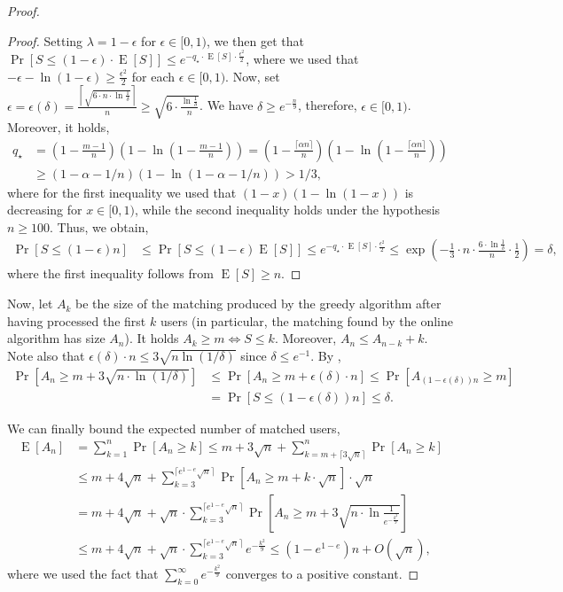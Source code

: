 \documentclass[11pt]{article}
\DeclareMathOperator*{\E}{E}
\begin{document}
\begin{proof}
\begin{proof}
Setting $\lambda = 1-\epsilon$ for $\epsilon \in [0,1)$, we then get that
$\Pr\left[S \le (1 - \epsilon) \cdot \E[S]\right] \le e^{-q_{\star} \cdot \E[S] \cdot \frac{\epsilon^2}2}$,
where we used that $-\epsilon - \ln (1-\epsilon) \ge \frac{\epsilon^2}2$ for each $\epsilon \in [0,1)$. Now, set $\epsilon=\epsilon(\delta) = \frac{\left\lceil \sqrt{6\cdot n \cdot \ln \frac{1}{\delta}} \right\rceil}{n} \geq \sqrt{6\cdot \frac{\ln \frac{1}{\delta}}{n}}$. We  have $\delta \geq e^{- \frac{n}{9}}$, therefore, $\epsilon\in [0,1)$. Moreover, it holds,
\begin{align*}
q_{\star} & =\left(1 - \frac{m-1}{n}\right)\left(1 - \ln\left(1-\frac{m-1}{n}\right)\right) =\left(1 - \frac{\lceil \alpha n \rceil}{n}\right)\left(1 - \ln\left(1-\frac{\lceil \alpha n \rceil}{n}\right)\right) \\
& \geq (1-\alpha - 1/n)(1- \ln(1-\alpha - 1/n)) > 1/3,
\end{align*}
where for the first inequality we used that $(1-x)(1 - \ln(1-x))$ is decreasing for $x\in[0,1)$, while the second inequality holds under the hypothesis $n\geq 100$. Thus, we obtain,
\begin{align*}
\Pr[S \leq (1-\epsilon) n] & \leq \Pr[S \leq (1-\epsilon) \E[S]]  \leq e^{-q_{\star} \cdot \E[S] \cdot \frac{\epsilon^2}{2}} \leq \exp\left(-\frac13 \cdot n \cdot \frac{6 \cdot \ln \frac{1}{\delta}}{n} \cdot \frac12 \right)  = \delta,
\end{align*}
where the first inequality follows from $\E[S] \geq n$.
\end{proof}
Now, let $A_k$ be the size of the matching produced by the greedy algorithm  after having processed the first $k$ users (in particular, the matching found by the online algorithm has size $A_n$). It holds $A_k \geq m \iff S \leq k$. Moreover, $A_{n} \leq A_{n-k} + k$. Note also that $\epsilon(\delta)\cdot n \leq 3\sqrt{n\ln(1/\delta)}$ since $\delta \leq e^{-1}$. By ,
\begin{align*}
\Pr[A_n \geq m + 3\sqrt{n\cdot \ln(1/\delta)}] &\leq \Pr[A_n \geq m + \epsilon(\delta)\cdot n] \leq \Pr[A_{(1-\epsilon(\delta))n} \geq m] \\
&= \Pr[S \leq (1-\epsilon(\delta))n] \leq \delta.
\end{align*}

We can finally bound the expected number of matched users,
\begin{align*}
\E[A_n] & = \sum_{k=1}^n \Pr[A_n \geq k]  \leq m + 3\sqrt{n} + \sum_{k=m+\lceil 3\sqrt{n} \rceil }^n \Pr[A_n \geq k] \\ 
& \leq m + 4\sqrt{n} + \sum_{k=3}^{\lceil e^{1-e} \sqrt{n} \rceil} \Pr[A_n \geq m + k\cdot \sqrt{n}] \cdot \sqrt{n} \\
& = m + 4\sqrt{n} +  \sqrt{n} \cdot \sum_{k=3}^{\lceil e^{1-e} \sqrt{n} \rceil} \Pr\left[A_n \geq m + 3\sqrt{n\cdot \ln\frac{1}{e^{-\frac{k^2}{9}}}}\right] \\
& \leq m + 4\sqrt{n} + \sqrt{n} \cdot \sum_{k=3}^{\lceil e^{1-e} \sqrt{n} \rceil} e^{-\frac{k^2}{9}} \le (1 - e^{1-e})n + O(\sqrt{n}),
\end{align*}
where we used the fact that $\sum_{k=0}^{\infty} e^{-\frac{k^2}{9}}$ converges to a positive constant.
\end{proof}
\end{document}
